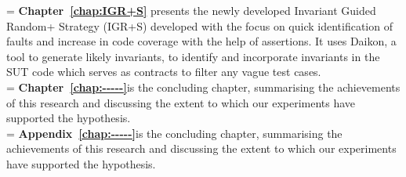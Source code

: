  
\hangindent=\parindent
{}
\noindent
\textbf{Chapter~\ref{chap:IGR+S}} presents the newly developed Invariant Guided Random+ Strategy (IGR+S) developed with the focus on quick identification of faults and increase in code coverage with the help of assertions. It uses Daikon, a tool to generate likely invariants, to identify and incorporate invariants in the SUT code which serves as contracts to filter any vague test cases. \\

\hangindent=\parindent
{}
\noindent
\textbf{Chapter~\ref{chap:-----}}is the concluding chapter, summarising the achievements of this research and discussing the extent to which our experiments have supported the hypothesis.\\


\hangindent=\parindent
{}
\noindent
\textbf{Appendix~\ref{chap:-----}}is the concluding chapter, summarising the achievements of this research and discussing the extent to which our experiments have supported the hypothesis.\\











